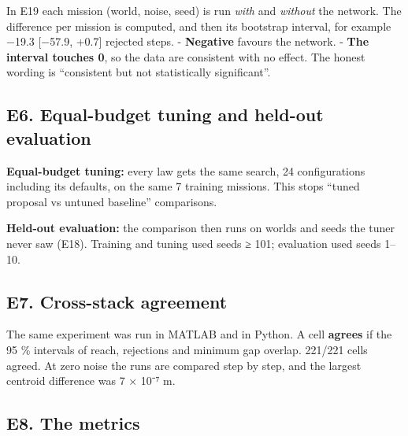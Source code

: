 \documentclass[
  10.5pt,
  a4paper,
]{article}
\begin{document}
In E19 each mission (world, noise, seed) is run \emph{with} and
\emph{without} the network. The difference per mission is computed, and
then its bootstrap interval, for example −19.3 {[}−57.9, +0.7{]}
rejected steps. - \textbf{Negative} favours the network. - \textbf{The
interval touches 0}, so the data are consistent with no effect. The
honest wording is ``consistent but not statistically significant''.

\hypertarget{e6.-equal-budget-tuning-and-held-out-evaluation}{%
\subsection{E6. Equal-budget tuning and held-out
evaluation}\label{e6.-equal-budget-tuning-and-held-out-evaluation}}

\textbf{Equal-budget tuning:} every law gets the same search, 24
configurations including its defaults, on the same 7 training missions.
This stops ``tuned proposal vs untuned baseline'' comparisons.

\textbf{Held-out evaluation:} the comparison then runs on worlds and
seeds the tuner never saw (E18). Training and tuning used seeds ≥ 101;
evaluation used seeds 1--10.

\hypertarget{e7.-cross-stack-agreement}{%
\subsection{E7. Cross-stack agreement}\label{e7.-cross-stack-agreement}}

The same experiment was run in MATLAB and in Python. A cell
\textbf{agrees} if the 95 \% intervals of reach, rejections and minimum
gap overlap. 221/221 cells agreed. At zero noise the runs are compared
step by step, and the largest centroid difference was 7 × 10⁻⁷ m.

\hypertarget{e8.-the-metrics}{%
\subsection{E8. The metrics}\label{e8.-the-metrics}}
\end{document}

